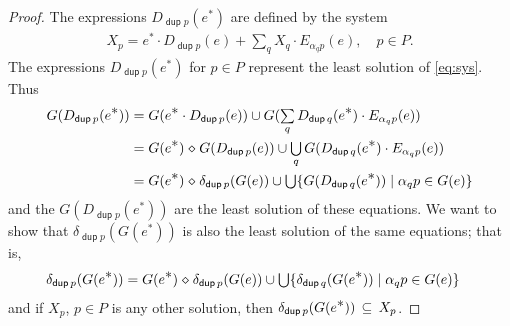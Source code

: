 \documentclass{article}
\renewcommand\smash{\mathrel{\diamond}}
\newcommand\ssum{\mathop{\textstyle\sum}}
\newcommand\sbigcup{\mathop{\textstyle\bigcup}}
\newcommand\pdup{\mathop{\mathsf{dup}}}
\renewcommand\star{^{\textstyle *}}
\begin{document}
\begin{proof}
The expressions $D_{\pdup p}(e\star)$ are defined by the system
\begin{align}
X_{p} = e\star\cdot D_{\pdup p}(e) + \ssum_{q} X_{q}\cdot E_{\alpha_qp}(e),\quad p\in P.\label{eq:sys}
\end{align}
The expressions $D_{\pdup p}(e\star)$ for $p\in P$ represent the least solution of \eqref{eq:sys}. Thus
\begin{align*}
G(D_{\pdup p}(e\star))
&= G(e\star\cdot D_{\pdup p}(e)) \cup G(\ssum_{q} D_{\pdup q}(e\star)\cdot E_{\alpha_qp}(e))\\
&= G(e\star)\smash G(D_{\pdup p}(e)) \cup \sbigcup_q G(D_{\pdup q}(e\star)\cdot E_{\alpha_qp}(e))\\
&= G(e\star)\smash\delta_{\pdup p}(G(e)) \cup \sbigcup \set{G(D_{\pdup q}(e\star))}{\alpha_qp\in G(e)}
\end{align*}
and the $G(D_{\pdup p}(e\star))$ are the least solution of these equations.
We want to show that $\delta_{\pdup p}(G(e\star))$ is also the least solution of the same equations; that is,
\begin{align}
\delta_{\pdup p}(G(e\star))
&= G(e\star)\smash\delta_{\pdup p}(G(e)) \cup \sbigcup \set{\delta_{\pdup q}(G(e\star))}{\alpha_qp\in G(e)}\label{eq:dsol}
\end{align}
and if $X_p$, $p\in P$ is any other solution, then $\delta_{\pdup p}(G(e\star)) \subs X_p$.


\end{proof}
\end{document}
